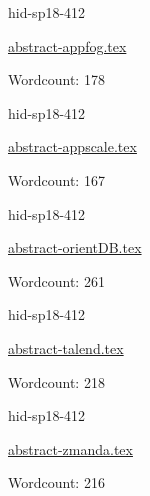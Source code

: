 \begin{IU}

hid-sp18-412

\href{https://github.com/cloudmesh-community/hid-sp18-412/blob/master//technology/abstract-appfog.tex}{abstract-appfog.tex}

 

Wordcount: 178

\end{IU}



\begin{IU}

hid-sp18-412

\href{https://github.com/cloudmesh-community/hid-sp18-412/blob/master//technology/abstract-appscale.tex}{abstract-appscale.tex}

 

Wordcount: 167

\end{IU}



\begin{IU}

hid-sp18-412

\href{https://github.com/cloudmesh-community/hid-sp18-412/blob/master//technology/abstract-orientDB.tex}{abstract-orientDB.tex}

 

Wordcount: 261

\end{IU}



\begin{IU}

hid-sp18-412

\href{https://github.com/cloudmesh-community/hid-sp18-412/blob/master//technology/abstract-talend.tex}{abstract-talend.tex}

 

Wordcount: 218

\end{IU}



\begin{IU}

hid-sp18-412

\href{https://github.com/cloudmesh-community/hid-sp18-412/blob/master//technology/abstract-zmanda.tex}{abstract-zmanda.tex}

 

Wordcount: 216

\end{IU}

